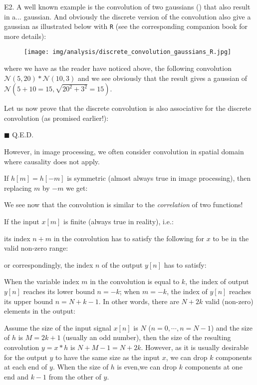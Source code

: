 \begin{tcolorbox}[colframe=black,colback=white,sharp corners,breakable]
	E2. A well known example is the convolution of two gaussians () that also result in a... gaussian. And obviously the discrete version of the convolution also give a gaussian as illustrated below with \texttt{R} (see the corresponding companion book for more details):
	\begin{figure}[H]
		\centering
		\texttt{[image: img/analysis/discrete\_convolution\_gaussians\_R.jpg]}
	\end{figure}
	where we have as the reader have noticed above, the following convolution $\mathcal{N}(5,20)*\mathcal{N}(10,3)$ and we see obviously that the result gives a gaussian of $\mathcal{N}(5+10=15,\sqrt{20^2+3^2}=15)$.
	\end{tcolorbox}
	Let us now prove that the discrete convolution is also associative for the discrete convolution (as promised earlier!):
	\begin{dem}
	
	\begin{flushright}
		$\blacksquare$  Q.E.D.
	\end{flushright}
	\end{dem}
	However, in image processing, we often consider convolution in spatial domain where causality does not apply.
	
	If $h[m]=h[-m]$ is symmetric (almost always true in image processing), then replacing $m$ by $-m$ we get:
	
	We see now that the convolution is similar to the {\em correlation} of two functions!
	
	If the input $x[m]$ is finite (always true in reality), i.e.:
	
	its index $n+m$ in the convolution has to satisfy the following for $x$ to be in the valid non-zero range:
		
	or correspondingly, the index $n$ of the output $y[n]$ has to satisfy:
	
	When the variable index $m$ in the convolution is equal to $k$, the index of output $y[n]$ reaches its lower bound $n=-k$; when $m=-k$, the index of $y[n]$ reaches its upper bound $n=N+k-1$. In other words,	there are $N+2k$ valid (non-zero) elements in the output:
		
	Assume the size of the input signal $x[n]$ is $N$ ($n=0,\cdots,n=N-1$) and the size of $h$ is $M=2k+1$ (usually an odd number), then the size of the resulting convolution $y=x*h$ is $N+M-1=N+2k$. However, as it is usually desirable for the output $y$ to have the same size as the input $x$, we can drop $k$ components at each end of $y$. When the size of $h$ is even,we can drop $k$ components at one end and $k-1$ from the other of $y$.
	
